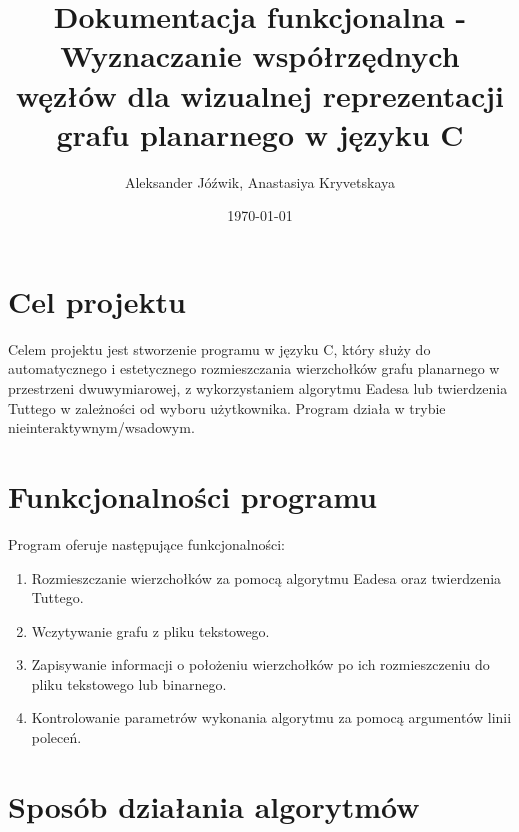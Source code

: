 \documentclass[]{article}
\title{Dokumentacja funkcjonalna - Wyznaczanie współrzędnych węzłów dla wizualnej reprezentacji grafu planarnego w języku C}
\author{\authoricon Aleksander Jóźwik, Anastasiya Kryvetskaya}
\date{\dateicon \today}
\begin{document}
	\noindent
	\maketitle

	\section{Cel projektu}
	Celem projektu jest stworzenie programu w języku C, który służy do automatycznego i estetycznego rozmieszczania
	wierzchołków grafu planarnego w przestrzeni dwuwymiarowej, z wykorzystaniem algorytmu Eadesa lub twierdzenia 
	Tuttego w zależności od wyboru użytkownika. Program działa w trybie nieinteraktywnym/wsadowym.
	\section{Funkcjonalności programu}
	Program oferuje następujące funkcjonalności:
	\begin{enumerate}
		\item Rozmieszczanie wierzchołków za pomocą algorytmu Eadesa oraz twierdzenia Tuttego.
		\item Wczytywanie grafu z pliku tekstowego.
		\item Zapisywanie informacji o położeniu wierzchołków po ich rozmieszczeniu do pliku tekstowego lub binarnego.
		\item Kontrolowanie parametrów wykonania algorytmu za pomocą argumentów linii poleceń.
	\end{enumerate}
	\section{Sposób działania algorytmów}
\end{document}
